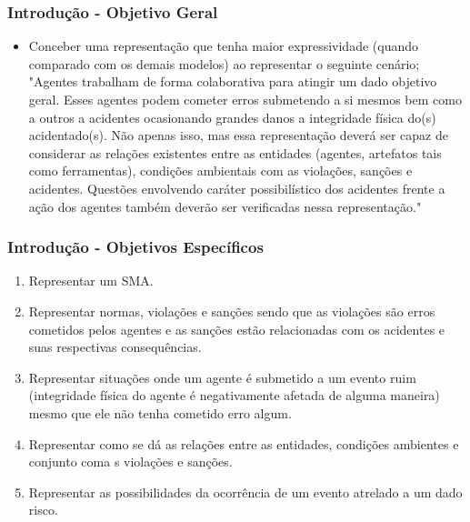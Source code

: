 \documentclass{beamer}
\begin{document}
\begin{frame}
\frametitle{Introdução - Objetivo Geral} %
	\begin{itemize}
		\item Conceber uma representação que tenha maior expressividade (quando comparado com os demais modelos) ao representar o seguinte cenário; "Agentes trabalham de forma colaborativa para atingir um dado objetivo geral. Esses agentes podem cometer erros submetendo a si mesmos bem como a outros a acidentes ocasionando grandes danos a integridade física do(s) acidentado(s). Não apenas isso, mas essa representação deverá ser capaz de considerar as relações existentes entre as entidades (agentes, artefatos tais como ferramentas), condições ambientais com as violações, sanções e acidentes. Questões envolvendo caráter possibilístico dos acidentes frente a ação dos agentes também deverão ser verificadas nessa representação."  
	\end{itemize}
\end{frame}

\begin{frame}
\frametitle{Introdução - Objetivos Específicos}
	\begin{enumerate}
		\item Representar um SMA. 
		\item Representar normas, violações e sanções sendo que as violações são erros cometidos pelos agentes e as sanções estão relacionadas com os acidentes e suas respectivas consequências.
		\item Representar situações onde um agente é submetido a um evento ruim (integridade física do agente é negativamente afetada de alguma maneira) mesmo que ele não tenha cometido erro algum. 
		\item Representar como se dá as relações entre as entidades, condições ambientes e conjunto coma s violações e sanções. 
		\item Representar as possibilidades da ocorrência de um evento atrelado a um dado risco. 
	\end{enumerate}
\end{frame}
\end{document}
